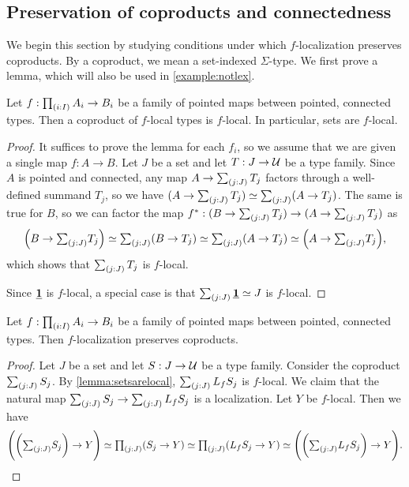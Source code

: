 \subsection{Preservation of coproducts and connectedness}\label{ss:connectedness}

We begin this section by studying conditions under which
$f$-localization preserves coproducts. 
By a coproduct, we mean a set-indexed $\Sigma$-type.
We first prove a lemma, which will also be used in \cref{example:notlex}.

\begin{lem}\label{lemma:setsarelocal}
    Let $f : \prd{i:I} A_i \to B_i$ be a family of pointed maps
    between pointed, connected types.
    Then a coproduct of $f$-local types is $f$-local.
    In particular, sets are $f$-local.
\end{lem}

\begin{proof}
    It suffices to prove the lemma for each $f_i$, so we assume
    that we are given a single map $f : A \to B$.
    Let $J$ be a set and let $T : J \to \mathcal{U}$ be a type family.
    Since $A$ is pointed and connected, any map $A \to \sm{j:J} T_j$ factors through a well-defined summand
    $T_j$, so we have $(A \to \sm{j:J} T_j) \simeq \sm{j:J} (A \to T_j)$. The same is true for $B$, so
    we can factor the map $\precomp{f} : (B \to \sm{j:J} T_j) \to (A \to \sm{j:J} T_j)$ as
    \[
        \Big(B \to \sm{j:J} T_j \Big) \simeq \sm{j:J} (B \to T_j) \simeq \sm{j:J} (A \to T_j) \simeq \Big(A \to \sm{j:J} T_j\Big),
    \]
    which shows that $\sm{j:J} T_j$ is $f$-local.

    Since $\underline{\mathbf{1}}$ is $f$-local, a special case is that $\sm{j:J} \unit \simeq J$ is $f$-local.
\end{proof}

\begin{cor}
    Let $f : \prd{i:I} A_i \to B_i$ be a family of pointed maps
    between pointed, connected types.
    Then $f$-localization preserves coproducts.
\end{cor}

\begin{proof}
    Let $J$ be a set and let $S : J \to \mathcal{U}$ be a type family.
    Consider the coproduct $\sm{j:J} S_j$.
    By \cref{lemma:setsarelocal}, $\sm{j:J} L_f S_j$ is $f$-local. We claim that the natural
    map $\sm{j:J} S_j \to \sm{j:J} L_f S_j$ is a localization.
    Let $Y$ be $f$-local. Then we have
    \[
        \Bigg( \bigg( \sm{j:J} S_j \bigg) \to Y \Bigg) \simeq \prd{j:J} (S_j \to Y) \simeq
        \prd{j:J} (L_f S_j \to Y) \simeq \Bigg( \bigg( \sm{j:J} L_f S_j \bigg) \to Y \Bigg).\qedhere
    \]
\end{proof}

